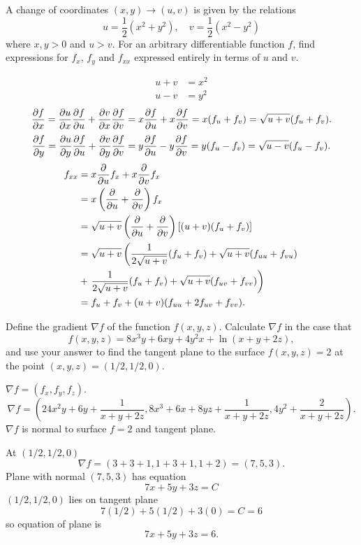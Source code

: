 \documentclass[10pt, a4paper]{article}
\begin{document}
\begin{problem}
    A change of coordinates $(x, y) \rightarrow (u, v)$ is given by the relations
    \[
    u = \frac{1}{2}(x ^ 2 + y ^ 2), \quad v = \frac{1}{2}(x ^ 2 - y ^ 2)
    \]
    where $x, y > 0$ and $u > v$.
    For an arbitrary differentiable function $f$,
    find expressions for $f_x$,
    $f_y$ and $f_{xx}$ expressed entirely in terms of $u$ and $v$.

    \begin{solution}
        \begin{align*}
            u + v &= x ^ 2 \\
            u - v &= y ^ 2
        \end{align*}
        \[
        \pd[f]{x} = \pd[u]{x}\pd[f]{u} + \pd[v]{x}\pd[f]{v} = x\pd[f]{u} + x\pd[f]{v} = x(f_u + f_v) = \sqrt{u + v}(f_u + f_v).
        \]
        \[
        \pd[f]{y} = \pd[u]{y}\pd[f]{u} + \pd[v]{y}\pd[f]{v} = y\pd[f]{u} - y\pd[f]{v} = y(f_u - f_v) = \sqrt{u - v}(f_u - f_v).
        \]
        \begin{align*}
            f_{xx} &= x\pd{u}f_x + x\pd{v}f_x \\
            &= x\left(\pd{u} + \pd{v}\right)f_x \\
            &= \sqrt{u + v}\left(\pd{u} + \pd{v}\right)[(u + v)(f_u + f_v)] \\
            &= \sqrt{u + v}\left(\frac{1}{2\sqrt{u + v}}(f_u + f_v) + \sqrt{u + v}(f_{uu} + f_{vu})\right. \\
            &+ \left.\frac{1}{2\sqrt{u + v}}(f_u + f_v) + \sqrt{u + v}(f_{uv} + f_{vv})\right) \\
            &= f_u + f_v + (u + v)(f_{uu} + 2f_{uv} + f_{vv}).
        \end{align*}
    \end{solution}
\end{problem}

\begin{problem}
    Define the gradient $\nabla f$ of the function $f(x, y, z)$.
    Calculate $\nabla f$ in the case that
    \[
    f(x, y, z) = 8x ^ 3y + 6xy + 4y ^ 2x + \ln(x + y + 2z),
    \]
    and use your answer to find the tangent plane to the surface $f(x, y, z) = 2$ at the point $(x, y, z) = (1 / 2, 1 / 2, 0)$.

    \begin{solution}
        $\nabla f = (f_x, f_y, f_z)$.
        \[
        \nabla f = \left(24x ^ 2y + 6y + \frac{1}{x + y + 2z}, 8x ^ 3 + 6x + 8yz + \frac{1}{x + y + 2z}, 4y ^ 2 + \frac{2}{x + y + 2z}\right).
        \]
        $\nabla f$ is normal to surface $f = 2$ and tangent plane.

        At $(1 / 2, 1 / 2, 0)$
        \[
        \nabla f = (3 + 3 + 1, 1 + 3 + 1, 1 + 2) = (7, 5, 3).
        \]
        Plane with normal $(7, 5, 3)$ has equation
        \[
        7x + 5y + 3z = C
        \]
        $(1 / 2, 1 / 2, 0)$ lies on tangent plane
        \[
        7(1 / 2) + 5(1 / 2) + 3(0) = C = 6
        \]
        so equation of plane is
        \[
        7x + 5y + 3z = 6.
        \]
    \end{solution}
\end{problem}
\end{document}
